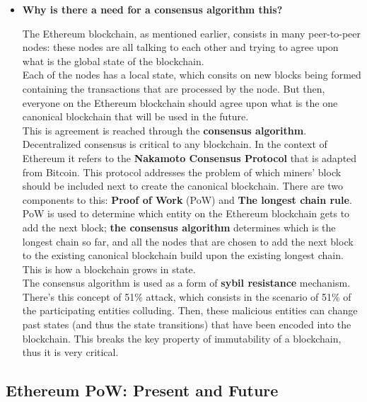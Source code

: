 \begin{itemize}
\item
  \textbf{Why is there a need for a consensus algorithm this?}

  The Ethereum blockchain, as mentioned earlier, consists in many
  peer-to-peer nodes: these nodes are all talking to each other and
  trying to agree upon what is the global state of the blockchain.\\

  Each of the nodes has a local state, which consits on new blocks being
  formed containing the transactions that are processed by the node. But
  then, everyone on the Ethereum blockchain should agree upon what is
  the one canonical blockchain that will be used in the future.\\

  This is agreement is reached through the \textbf{consensus algorithm}.
  Decentralized consensus is critical to any blockchain. In the context
  of Ethereum it refers to the \textbf{Nakamoto Consensus Protocol} that
  is adapted from Bitcoin. This protocol addresses the problem of which
  miners' block should be included next to create the canonical
  blockchain. There are two components to this: \textbf{Proof of Work}
  (PoW) and \textbf{The longest chain rule}.\\

  PoW is used to determine which entity on the Ethereum blockchain gets
  to add the next block; \textbf{the consensus algorithm} determines
  which is the longest chain so far, and all the nodes that are chosen
  to add the next block to the existing canonical blockchain build upon
  the existing longest chain. This is how a blockchain grows in state.\\

  The consensus algorithm is used as a form of \textbf{sybil resistance}
  mechanism. There's this concept of 51\% attack, which consists in the
  scenario of 51\% of the participating entities colluding. Then, these
  malicious entities can change past states (and thus the state
  transitions) that have been encoded into the blockchain. This breaks
  the key property of immutability of a blockchain, thus it is very
  critical.
\end{itemize}

\subsection{Ethereum PoW: Present and
Future}\label{ethereum-pow-present-and-future}

